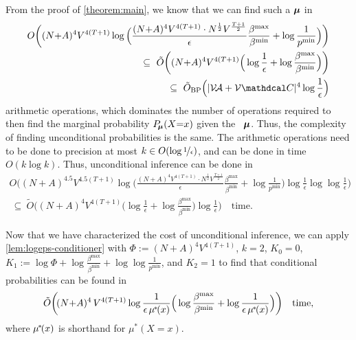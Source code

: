 \begin{subappendices}
\begin{lproof}
    From the proof of \cref{theorem:main}, we know that we can find
    such a $\boldsymbol\mu$ 
    in
    \begin{align*}
        O\bigg( 
            (N{+}A)^4 V^{4(T+1)}
            \log \Big( \frac{(N{+}A)^4 V^{4(T+1)}\cdot N^{\frac12} V^{\frac{T+1}{2}}}{\epsilon} \frac{\beta^{\max}}{\beta^{\min}} + \log \frac1{p^{\min}} \Big) 
        \bigg) \\
        ~\subseteq~
        \tilde O\bigg( 
            (N{+}A)^4 V^{4(T+1)}
            \Big(
            \log \frac1\epsilon + \log \frac{\beta^{\max}}{\beta^{\min}}\Big) 
        \bigg) \\
        ~\subseteq~
        \tilde O_{\text{BP}}\Big(|\V\!\Ar + \V \C|^{4}\log \frac{1}{\epsilon} \Big)
    \end{align*}
    arithmetic operations,
    which dominates the number of operations required to then find the marginal probability $P_{\!\boldsymbol\mu}(X{=}x)$ given the \actree\ $\boldsymbol\mu$.
    Thus, the complexity of finding unconditional probabilities is the same. 
    The arithmetic operations need to be done to precision at most $k \in O(\log\nicefrac1\epsilon)$, and can be done in time $O(k\log k)$. 
    Thus, unconditional inference can be done in 
    \begin{align*}
        O\bigg( 
            (N{+}A)^{4.5} V^{4.5(T+1)}
            \log \Big( \frac{(N{+}A)^4 V^{4(T+1)}\cdot N^{\frac12} V^{\frac{T+1}{2}}}{\epsilon} \frac{\beta^{\max}}{\beta^{\min}} + \log \frac1{p^{\min}} \Big) 
            \log\frac{1}{\epsilon} \log\log\frac{1}{\epsilon}
        \bigg) \\
        ~\subseteq~
        \tilde O\bigg( 
            (N{+}A)^4 V^{4(T+1)}
            \Big(
            \log \frac1\epsilon + \log \frac{\beta^{\max}}{\beta^{\min}}\Big) 
            \log \frac1\epsilon
        \bigg)
        \quad\text{time}. 
    \end{align*}
    
    \def\mustar{\mu^{\mskip-2mu*\!}}
    Now that we have characterized the cost of unconditional inference, we can apply \cref{lem:logeps-conditioner} with $\Phi := (N+A)^4 V^{4(T+1)}$,
    $k = 2$,
    $K_0 = 0$, 
    $K_1 := \log \Phi + \log \frac{\beta^{\max}}{\beta^{\min}} + \log \log \frac1{p^{\min}}$, 
    and
    $K_2 = 1$
    to find that conditional probabilities can be found in
    \begin{align*}
        \tilde O \bigg(\! (N{+}A)^4\,V^{4(T+1)} 
        \log \frac1{\epsilon\,\mustar(x)}
        \Big(
              \log \frac{\beta^{\max}}{\beta^{\min}} 
               + \log \frac1{\epsilon\, \mustar(x)} 
         \Big)\bigg) 
        \quad \text{time},
    \end{align*}
    where $\mustar(x)$ is shorthand for
    $\mu^*(X{=}x)$. 
\end{lproof}


\end{subappendices}
